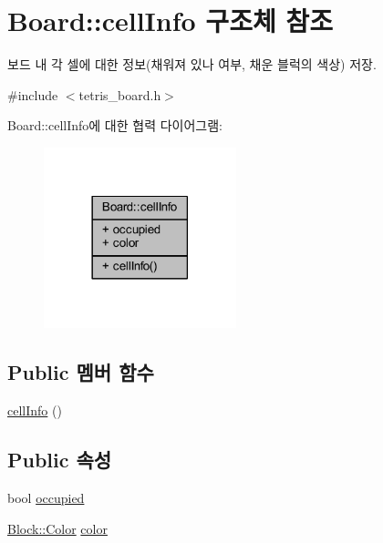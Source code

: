 \hypertarget{struct_board_1_1cell_info}{}\section{Board\+:\+:cell\+Info 구조체 참조}
\label{struct_board_1_1cell_info}


보드 내 각 셀에 대한 정보(채워져 있나 여부, 채운 블럭의 색상) 저장.  




{\ttfamily \#include $<$tetris\+\_\+board.\+h$>$}



Board\+:\+:cell\+Info에 대한 협력 다이어그램\+:
\nopagebreak
\begin{figure}[H]
\begin{center}
\leavevmode
\includegraphics[width=158pt]{struct_board_1_1cell_info__coll__graph}
\end{center}
\end{figure}
\subsection*{Public 멤버 함수}
\begin{DoxyCompactItemize}
\item 
\mbox{\hyperlink{struct_board_1_1cell_info_a6912555905168decac5c8dd1fba998a9}{cell\+Info}} ()
\end{DoxyCompactItemize}
\subsection*{Public 속성}
\begin{DoxyCompactItemize}
\item 
bool \mbox{\hyperlink{struct_board_1_1cell_info_a518ee0af8b662d092a1e4dffefadf27c}{occupied}}
\item 
\mbox{\hyperlink{class_block_ad054b4ac51df79aa910040b2a2fdf7b5}{Block\+::\+Color}} \mbox{\hyperlink{struct_board_1_1cell_info_ac4e0ca21aefe0f000144641e5eb6698d}{color}}
\end{DoxyCompactItemize}


